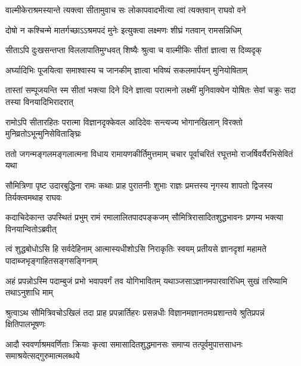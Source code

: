 \twolineshloka
{वाल्मीकेराश्रमस्यान्ते त्यक्त्वा सीतामुवाच सः}
{लोकापवादभीत्या त्वां त्यक्तवान् राघवो वने} %

\twolineshloka
{दोषो न कश्चिन्मे मातर्गच्छाऽऽश्रमपदं मुनेः}
{इत्युक्त्वा लक्ष्मणः शीघ्रं गतवान् रामसन्निधिम्} %

\twolineshloka
{सीताऽपि दुःखसन्तप्ता विललापातिमुग्धवत्}
{शिष्यैः श्रुत्वा च वाल्मीकिः सीतां ज्ञात्वा स दिव्यदृक्} %

\twolineshloka
{अर्घ्यादिभिः पूजयित्वा समाश्वास्य च जानकीम्}
{ज्ञात्वा भविष्यं सकलमार्पयन् मुनियोषिताम्} %

\threelineshloka
{तास्तां सम्पूजयन्ति स्म सीतां भक्त्या दिने दिने}
{ज्ञात्वा परात्मनो लक्ष्मीं मुनिवाक्येन योषितः}
{सेवां चक्रुः सदा तस्या विनयादिभिरादरात्} %

\fourlineindentedshloka
{रामोऽपि सीतारहितः परात्मा}
{विज्ञानदृक्केवल आदिदेवः}
{सन्त्यज्य भोगानखिलान् विरक्तो}
{मुनिव्रतोऽभून्मुनिसेविताङ्घ्रिः} %






\fourlineindentedshloka
{ततो जगन्मङ्गलमङ्गलात्मना}
{विधाय रामायणकीर्तिमुत्तमाम्}
{चचार पूर्वाचरितं रघूत्तमो}
{राजर्षिवर्यैरभिसेवितं यथा} %

\fourlineindentedshloka
{सौमित्रिणा पृष्ट उदारबुद्धिना}
{रामः कथाः प्राह पुरातनीः शुभाः}
{राज्ञः प्रमत्तस्य नृगस्य शापतो}
{द्विजस्य तिर्यक्त्वमथाह राघवः} %

\fourlineindentedshloka
{कदाचिदेकान्त उपस्थितं प्रभुम्}
{रामं रमालालितपादपङ्कजम्}
{सौमित्रिरासादितशुद्धभावनः}
{प्रणम्य भक्त्या विनयान्वितोऽब्रवीत्} %

\fourlineindentedshloka
{त्वं शुद्धबोधोऽसि हि सर्वदेहिनाम्}
{आत्मास्यधीशोऽसि निराकृतिः स्वयम्}
{प्रतीयसे ज्ञानदृशां महामते}
{पादाब्जभृङ्गाहितसङ्गसङ्गिनाम्} %

\fourlineindentedshloka
{अहं प्रपन्नोऽस्मि पदाम्बुजं प्रभो}
{भवापवर्गं तव योगिभावितम्}
{यथाञ्जसाऽज्ञानमपारवारिधिम्}
{सुखं तरिष्यामि तथाऽनुशाधि माम्} %

\fourlineindentedshloka
{श्रुत्वाऽथ सौमित्रिवचोऽखिलं तदा}
{प्राह प्रपन्नार्तिहरः प्रसन्नधीः}
{विज्ञानमज्ञानतमःप्रशान्तये}
{श्रुतिप्रपन्नं क्षितिपालभूषणः} %

\fourlineindentedshloka
{आदौ स्ववर्णाश्रमवर्णिताः क्रियाः}
{कृत्वा समासादितशुद्धमानसः}
{समाप्य तत्पूर्वमुपात्तसाधनः}
{समाश्रयेत्सद्गुरुमात्मलब्धये} %

